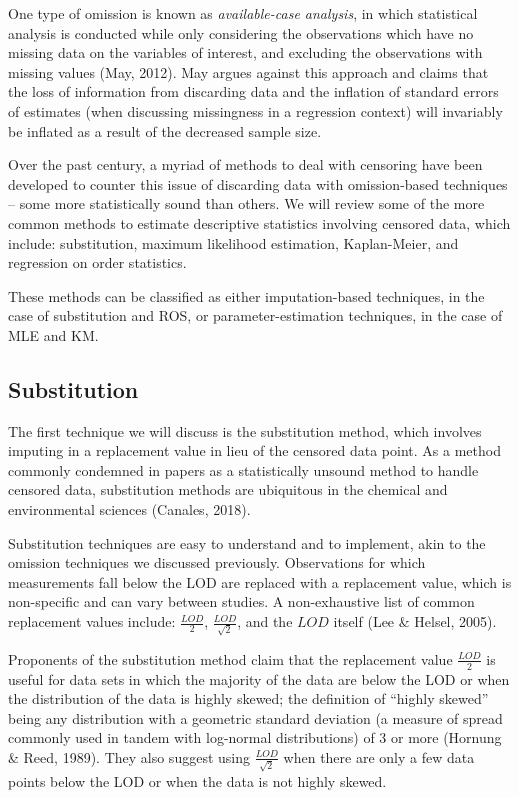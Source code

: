 \documentclass[12pt, twoside]{amherstthesis}
\begin{document}
One type of omission is known as \emph{available-case analysis}, in which statistical analysis is conducted while only considering the observations which have no missing data on the variables of interest, and excluding the observations with missing values (May, 2012). May argues against this approach and claims that the loss of information from discarding data and the inflation of standard errors of estimates (when discussing missingness in a regression context) will invariably be inflated as a result of the decreased sample size.

Over the past century, a myriad of methods to deal with censoring have been developed to counter this issue of discarding data with omission-based techniques -- some more statistically sound than others. We will review some of the more common methods to estimate descriptive statistics involving censored data, which include: substitution, maximum likelihood estimation, Kaplan-Meier, and regression on order statistics.

These methods can be classified as either imputation-based techniques, in the case of substitution and ROS, or parameter-estimation techniques, in the case of MLE and KM.

\hypertarget{Substitution}{%
\subsection{Substitution}\label{Substitution}}

The first technique we will discuss is the substitution method, which involves imputing in a replacement value in lieu of the censored data point. As a method commonly condemned in papers as a statistically unsound method to handle censored data, substitution methods are ubiquitous in the chemical and environmental sciences (Canales, 2018).

Substitution techniques are easy to understand and to implement, akin to the omission techniques we discussed previously. Observations for which measurements fall below the LOD are replaced with a replacement value, which is non-specific and can vary between studies. A non-exhaustive list of common replacement values include: \(\frac{LOD}{2}\), \(\frac{LOD}{\sqrt2}\), and the \(LOD\) itself (Lee \& Helsel, 2005).

Proponents of the substitution method claim that the replacement value \(\frac{LOD}{2}\) is useful for data sets in which the majority of the data are below the LOD or when the distribution of the data is highly skewed; the definition of ``highly skewed'' being any distribution with a geometric standard deviation (a measure of spread commonly used in tandem with log-normal distributions) of 3 or more (Hornung \& Reed, 1989). They also suggest using \(\frac{LOD}{\sqrt2}\) when there are only a few data points below the LOD or when the data is not highly skewed.
\end{document}
